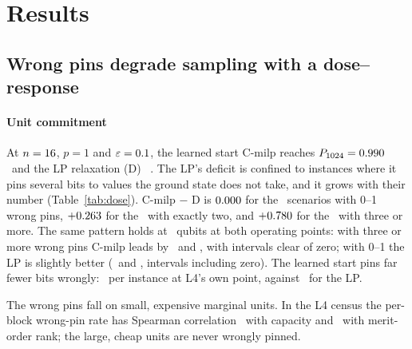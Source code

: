 \section{Results}
\label{sec:results}

\subsection{Wrong pins degrade sampling with a dose--response}
\label{sec:res-pins}

\paragraph{Unit commitment} At $n=16$, $p=1$ and $\varepsilon=0.1$, the learned start C-milp reaches $P_{1024}=0.990$ \PgndCICmilp\ and the LP relaxation (D) \PgndD\ \PgndCID. The LP's deficit is confined to instances where it pins several bits to values the ground state does not take, and it grows with their number (Table~\ref{tab:dose}). C-milp $-$ D is $0.000$ for the \DoseLtwoLowN\ scenarios with 0--1 wrong pins, $+0.263$ for the \DoseLtwoTwoN\ with exactly two, and $+0.780$ for the \DoseLtwoThreeN\ with three or more. The same pattern holds at \NLfour\ qubits at both operating points: with three or more wrong pins C-milp leads by \DoseLfourFrzThree\ and \DoseLfourOwnThree, with intervals clear of zero; with 0--1 the LP is slightly better (\DoseLfourFrzLow\ and \DoseLfourOwnLow, intervals including zero). The learned start pins far fewer bits wrongly: \LfourOwnWrongCmilp\ per instance at L4's own point, against \LfourOwnWrongD\ for the LP.

The wrong pins fall on small, expensive marginal units. In the L4 census the per-block wrong-pin rate has Spearman correlation \ConcCapLfour\ with capacity and \ConcRankLfour\ with merit-order rank; the large, cheap units are never wrongly pinned.

